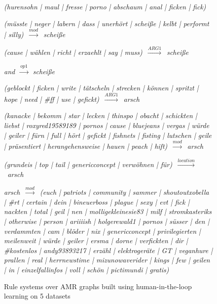 \documentclass[sigconf,anonymous]{acmart}
\begin{document}
\begin{figure*}
\begin{description}
	\small
	\item \textit{(hurensohn | maul | fresse | porno | abschaum | anal | ficken |
		fick)}
	\item \textit{(m\"usste | neger | labern | dass | unerh\"ort | schei{\ss}e | kelbt | performt | silly)~$\xrightarrow{mod}$~schei{\ss}e}
	\item \textit{(cause | w\"ahlen | richt | erzaehlt | say | muss)~$\xrightarrow{ARG1}$~schei{\ss}e}
	\item \textit{and~$\xrightarrow{op1}$~schei{\ss}e}
	\item \textit{(geblockt | ficken | write | t\"atscheln | strecken | k\"onnen | spritzt | hope | need | \#ff | use | gefickt)~$\xrightarrow{ARG1}$~arsch}
	\item \textit{(kanacke | bekomm | star | lecken | thinspo | obacht | schickten | liebst | roxyred19589189 | pornos | cause | bluejeans | vergas | w\"urde | geiler | f\"urn | full | h\"ort | gefickt | fishnets | fisting | lutschen | geile | pr\"asentiert | herangehensweise | hauen | peach | hift)~$\xrightarrow{mod}$~arsch}
	\item \textit{(grundeis | top | tail | genericconcept | verw\"ohnen | f\"ur)~$\xrightarrow{location}$~arsch}
	\item \textit{arsch~$\xrightarrow{mod}$~(euch | patriots | community | sammer | shoutoutxobella | \#rt | certain | dein | bineuerboss | plague | sexy | evt | fick | nackten | total | geil | nen | molligekleinesie83 | milf | stromkasteriks | otherwise | person | ariiiish | holgerewald1 | pornos | s\"usser | den | verdammten | cam | bl\"oder | nix | genericconcept | privilegierten | meilenweit | w\"urde | geiler | ersma | dorne | verfickten | dir | \#kostenlos | andy93893217 | erz\"ahl | elektroger\"ate | GT | veganhure | prallen | real | herrnewstime | mizunowaverider | kings | few | geilen | in | einzelfallinfos | voll | sch\"on | pictimundi | gratis)}
\end{description}

    \caption{Rule systems over AMR graphs built using human-in-the-loop learning on 5
    datasets}
	\label{fig:rules}
\end{figure*}
\end{document}
